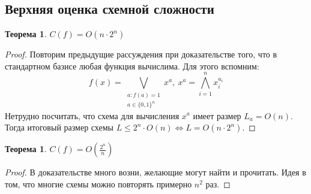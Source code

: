 \documentclass[a4paper, 12pt]{article}
\newtheorem*{on2n}{Теорема}
\newtheorem*{o2ndivn}{Теорема}
\begin{document}
\subsection*{Верхняя оценка схемной сложности}
\begin{on2n}
    $C(f) = O(n \cdot 2^n)$
\end{on2n}
\begin{proof}
    Повторим предыдущие рассуждения при доказательстве того, что в стандартном
    базисе любая функция вычислима. Для этого вспомним:
    \[
    f(x) = \bigvee\limits_{\substack{a: f(a) = 1 \\ a \in \{0, 1\}^n}} x^a, \ 
    x^a = \bigwedge\limits_{i = 1}^{n} x_i^{a_i}
    \]
    Нетрудно посчитать, что схема для вычисления $x^a$ имеет размер $L_a = O(n)$.
    Тогда итоговый размер схемы $L \leqslant 2^n \cdot O(n) \iff L = O(n \cdot 2^n)$.
\end{proof}
\begin{o2ndivn}
    $C(f) = O(\frac{2^n}{n})$
\end{o2ndivn}
\begin{proof}
    В доказательстве много возни, желающие могут найти и прочитать.
    Идея в том, что многие схемы можно повторять примерно $n^2$ раз.
\end{proof}
\end{document}
